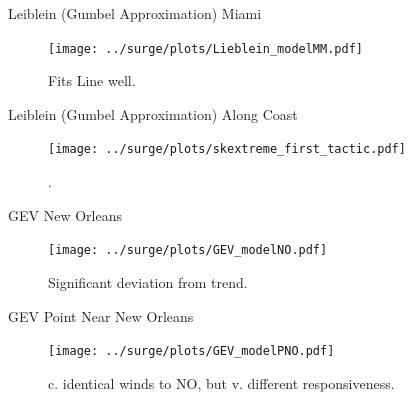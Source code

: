 \begin{frame}{Leiblein (Gumbel Approximation) Miami}
\vspace{-20pt}
 \begin{minipage}{1.0\textwidth}
\begin{figure}[htb!]
    \centering
    \texttt{[image: ../surge/plots/Lieblein\_modelMM.pdf]}
    \vspace{-15pt}
   \caption{Fits Line well. }
    \label{fig:}
\end{figure}
\end{minipage}
\end{frame}


\begin{frame}{Leiblein (Gumbel Approximation) Along Coast}
\vspace{-20pt}
 \begin{minipage}{1.0\textwidth}
\begin{figure}[htb!]
    \centering
    \texttt{[image: ../surge/plots/skextreme\_first\_tactic.pdf]}
    \vspace{-15pt}
   \caption{. }
    \label{fig:}
\end{figure}
\end{minipage}
\end{frame}


\begin{frame}{GEV New Orleans}
\vspace{-20pt}
 \begin{minipage}{1.0\textwidth}
\begin{figure}[htb!]
    \centering
    \texttt{[image: ../surge/plots/GEV\_modelNO.pdf]}
    \vspace{-15pt}
   \caption{Significant deviation from trend. }
    \label{fig:}
\end{figure}
\end{minipage}
\end{frame}


\begin{frame}{GEV Point Near New Orleans}
\vspace{-20pt}
 \begin{minipage}{1.0\textwidth}
\begin{figure}[htb!]
    \centering
    \texttt{[image: ../surge/plots/GEV\_modelPNO.pdf]}
    \vspace{-15pt}
   \caption{c. identical winds to NO, but v. different
     responsiveness. }
    \label{fig:}
\end{figure}
\end{minipage}
\end{frame}


